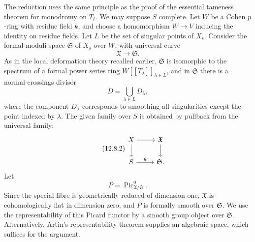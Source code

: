 \documentclass[11pt]{article}
\providecommand{\Pic}{\operatorname{Pic}}
\begin{document}
The reduction uses the same principle as the proof of the essential tameness theorem for monodromy on \(T_\ell\).  We may suppose \(S\) complete.  Let \(W\) be a Cohen \(p\)-ring with residue field \(k\), and choose a homomorphism \(W\to V\) inducing the identity on residue fields.  Let \(L\) be the set of singular points of \(X_s\).  Consider the formal moduli space \(\mathfrak S\) of \(X_s\) over \(W\), with universal curve
\[
        \mathfrak X\longrightarrow\mathfrak S.
\]
As in the local deformation theory recalled earlier, \(\mathfrak S\) is isomorphic to the spectrum of a formal power series ring \(W[[T_\lambda]]_{\lambda\in L}\), and in \(\mathfrak S\) there is a normal-crossings divisor
\begin{equation}\tag{12.8.1}
        D=\bigcup_{\lambda\in L}D_\lambda,
\end{equation}
where the component \(D_\lambda\) corresponds to smoothing all singularities except the point indexed by \(\lambda\).  The given family over \(S\) is obtained by pullback from the universal family:
\begin{equation}\tag{12.8.2}
\begin{tikzcd}
X\arrow[r]\arrow[d]&\mathfrak X\arrow[d]\\
S\arrow[r,"g"]&\mathfrak S.
\end{tikzcd}
\end{equation}
Let
\begin{equation}\tag{12.8.3}
        P=\Pic^0_{\mathfrak X/\mathfrak S}.
\end{equation}
Since the special fibre is geometrically reduced of dimension one, \(\mathfrak X\) is cohomologically flat in dimension zero, and \(P\) is formally smooth over \(\mathfrak S\).  We use the representability of this Picard functor by a smooth group object over \(\mathfrak S\).  Alternatively, Artin's representability theorem supplies an algebraic space, which suffices for the argument.
\end{document}
